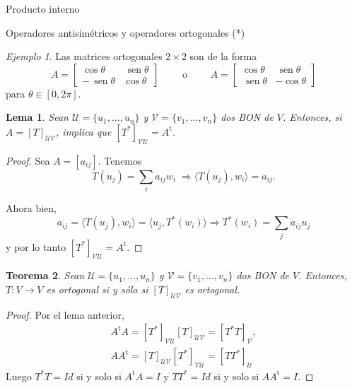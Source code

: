 \documentclass[a4paper,12pt,twoside,spanish,reqno]{amsbook}
\numberwithin{equation}{section}
\newtheorem{teorema}{Teorema}[section]
\newtheorem{lema}[teorema]{Lema}
\theoremstyle{definition}
\theoremstyle{remark}
\newtheorem*{ejemplo*}{Ejemplo}
\newcommand{\la}{\langle}
\newcommand{\ra}{\rangle}
\renewcommand{\t}{{\operatorname{t}}}
\renewcommand{\sin}{{\,\operatorname{sen}}}
\begin{document}
\begin{chapter}{Producto interno}
\begin{section}{Operadores antisimétricos y operadores ortogonales (*)}
        \begin{ejemplo*}
            Las matrices ortogonales $2 \times 2$ son de la forma
            $$
            A = \begin{bmatrix}
            \cos\theta &\sin\theta \\
            -\sin\theta & \cos\theta
            \end{bmatrix} \qquad\text{ o }\qquad 
            A = \begin{bmatrix}
            \cos\theta &\sin\theta \\
            \sin\theta & -\cos\theta
            \end{bmatrix}
            $$
            para $\theta \in [0,2\pi]$. 
        \end{ejemplo*}
        
        \begin{lema}\label{lema-th-6.5}
            Sean $\mathcal U = \{u_1,\ldots,u_n\}$ y $\mathcal V = \{v_1,\ldots,v_n\}$ dos BON de $V$. Entonces, si $A=[T]_{\mathcal U \mathcal V}$, implica que $[T^*]_{\mathcal V \mathcal U} = A^{\t}$.
        \end{lema}
        \begin{proof} Sea $A = [a_{ij}]$. 
        Tenemos  
        $$T(u_j) = \sum_i a_{ij}w_i \; \Rightarrow\la T(u_j),w_i \ra = a_{ij}.$$ 
        
        Ahora bien, 
        $$a_{ij} = \la T(u_j),w_i \ra =\la u_j,T^*(w_i) \ra \Rightarrow  T^*(w_i) = \sum_j a_{ij} u_j$$ y por lo tanto  $[T^*]_{\mathcal V \mathcal U} = A^{\t}$. 
            
        \end{proof}
        
        \begin{teorema} \label{th-6.5}Sean $\mathcal U = \{u_1,\ldots,u_n\}$ y $\mathcal V = \{v_1,\ldots,v_n\}$ dos BON de $V$. Entonces, $T:V\to V$  es ortogonal si y sólo si $[T]_{\mathcal U \mathcal V}$ es ortogonal. 
        \end{teorema}
        \begin{proof}
            
            Por el lema anterior, 
            \begin{align*}
                    A^{\t}A = [T^*]_{\mathcal V \mathcal U} [T]_{\mathcal U \mathcal V} = [T^*T]_{\mathcal V},\\
                    AA^{\t} = [T]_{\mathcal U \mathcal V}[T^*]_{\mathcal V \mathcal U} = [TT^*]_{\mathcal U}
            \end{align*} 
            Luego $T^*T = Id$ si y solo si $A^{\t}A=I$ y  $TT^* = Id$ si y solo si $AA^{\t}=I$.
        \end{proof}
        

\end{section}
\end{chapter}
\end{document}
